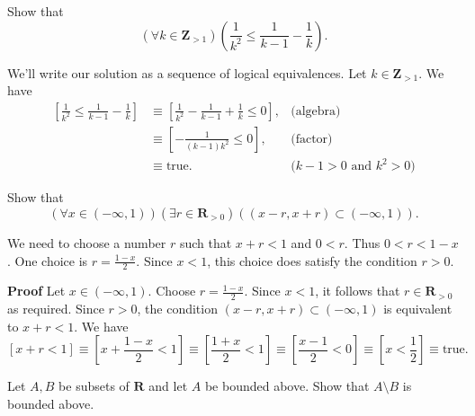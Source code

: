 \documentclass[12pt,fleqn,answers]{exam}
\newcommand{\reals}{\mathbf{R}}
\newcommand{\integers}{\mathbf{Z}}
\newcommand{\true}{\mbox{true}}
\newcommand{\quiz}{Review for Exam I}
\newcommand{\term}{Fall}
\begin{document}
\large
\noindent{\textbf \quiz}


\begin{questions} 




\question Show that 
\[
    \left(\forall k \in \integers_{>1} \right) 
      \left(\frac{1}{k^2} \leq \frac{1}{k-1} - \frac{1}{k} \right).
\]

\begin{solution}
  We'll write our solution as a sequence of logical equivalences. Let $k \in 
  \integers_{>1}$. We have
  \begin{align*}
    \left[\frac{1}{k^2} \leq \frac{1}{k-1} - \frac{1}{k} \right] &\equiv
    \left[\frac{1}{k^2} - \frac{1}{k-1} + \frac{1}{k}  \leq 0 \right], &\mbox{(algebra)} \\
    &\equiv \left[ -\frac{1}{(k-1) k^2}  \leq 0 \right], &\mbox{(factor)} \\
    &\equiv \true. &\mbox{($k - 1 > 0$ and $k^2 > 0$)}
  \end{align*}
  
\end{solution}
\question Show that
\[
    \left(\forall x \in (-\infty, 1) \right)\left( \exists r \in \reals_{>0} \right)
    \left((x-r,x+r) \subset (-\infty, 1) \right).
\]

\begin{solution}
  We need to choose a number $r$ such that $x+r < 1$ and $0 < r$. 
  Thus $0 < r < 1-x$. One choice is $r = \frac{1-x}{2}$. Since $x < 1$,
  this choice does satisfy the condition $r > 0$.

  \textbf{Proof} Let $x \in (-\infty, 1) $. Choose $r = \frac{1-x}{2}$. Since  $x < 1$,
  it follows that $r \in  \reals_{>0}$ as required. Since $ r > 0$, the condition
  \( (x-r,x+r) \subset (-\infty, 1)\) is equivalent to $x + r < 1$.
  We have
  \[
    \left[x + r < 1 \right] \equiv  \left[x +  \frac{1-x}{2} < 1 \right]
    \equiv \left[\frac{1+x}{2} < 1 \right] \equiv \left[\frac{x-1}{2} < 0 \right]
    \equiv \left[ x < \frac{1}{2} \right] \equiv \true.
  \]
\end{solution}

\question Let $A,B$ be subsets of $\reals$ and let $A$ be bounded above.
Show that $A \setminus B$ is bounded above.


\end{questions}
\end{document}
